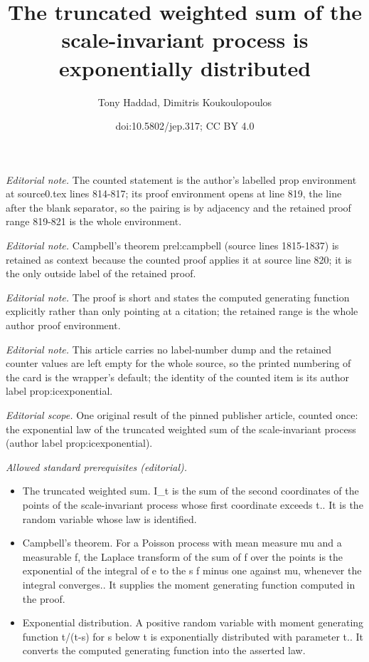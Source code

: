 \documentclass[10pt,a4paper]{article}
\title{The truncated weighted sum of the scale-invariant process is exponentially distributed}
\author{Tony Haddad, Dimitris Koukoulopoulos}
\date{doi:10.5802/jep.317; CC BY 4.0}
\theoremstyle{plain}
\theoremstyle{definition}
\begin{document}
\maketitle
\noindent\textit{Editorial note.} The counted statement is the author's labelled prop environment at source0.tex lines 814-817; its proof environment opens at line 819, the line after the blank separator, so the pairing is by adjacency and the retained proof range 819-821 is the whole environment.\par\medskip
\noindent\textit{Editorial note.} Campbell's theorem prel:campbell (source lines 1815-1837) is retained as context because the counted proof applies it at source line 820; it is the only outside label of the retained proof.\par\medskip
\noindent\textit{Editorial note.} The proof is short and states the computed generating function explicitly rather than only pointing at a citation; the retained range is the whole author proof environment.\par\medskip
\noindent\textit{Editorial note.} This article carries no label-number dump and the retained counter values are left empty for the whole source, so the printed numbering of the card is the wrapper's default; the identity of the counted item is its author label prop:icexponential.\par\medskip
\noindent\textit{Editorial scope.} One original result of the pinned publisher article, counted once: the exponential law of the truncated weighted sum of the scale-invariant process (author label prop:icexponential).\par\medskip
\noindent\textit{Allowed standard prerequisites (editorial).}\begin{itemize}
\item The truncated weighted sum. I\_t is the sum of the second coordinates of the points of the scale-invariant process whose first coordinate exceeds t.. It is the random variable whose law is identified.
\item Campbell's theorem. For a Poisson process with mean measure mu and a measurable f, the Laplace transform of the sum of f over the points is the exponential of the integral of e to the s f minus one against mu, whenever the integral converges.. It supplies the moment generating function computed in the proof.
\item Exponential distribution. A positive random variable with moment generating function t/(t-s) for s below t is exponentially distributed with parameter t.. It converts the computed generating function into the asserted law.
\end{itemize}\medskip
\end{document}
